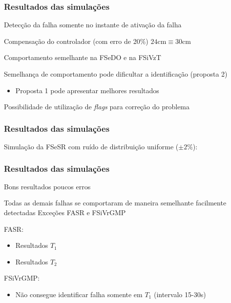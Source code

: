 \documentclass{beamer}
\begin{document}
\begin{frame}
    \frametitle{Resultados das simulações}

    Detecção da falha somente no instante de ativação da falha

    \vspace{0.25cm}

    Compensação do controlador (com erro de 20\%) \implica $24 \text{cm} \equiv
    30 \text{cm}$

    \vspace{0.25cm}

    Comportamento semelhante na FSeDO e na FSiVzT

    \vspace{0.25cm}

    Semelhança de comportamento pode dificultar a identificação (proposta 2)

\begin{itemize}
    \item Proposta 1 pode apresentar melhores resultados
\end{itemize}

    Possibilidade de utilização de {\it flags} para correção do problema

\end{frame}

\begin{frame}
    \frametitle{Resultados das simulações}

\footnotesize Simulação da FSeSR com ruído de distribuição uniforme ($\pm 2\%$):

\begin{figure}[htb]
\footnotesize
\centering
\scalebox{0.68}{}
\end{figure}
    
\end{frame}

\begin{frame}
    \frametitle{Resultados das simulações}

    Bons resultados \implica poucos erros

    \vspace{0.25cm}

    Todas as demais falhas se comportaram de maneira semelhante \implica
    facilmente detectadas \implica Exceções FASR e FSiVrGMP

    \vspace{0.25cm}

    FASR:

\begin{itemize}
    \item Resultados $T_1$ \alert{\Checkmark}
    \item Resultados $T_2$ \alert{\XSolidBrush}
\end{itemize}

    FSiVrGMP:

\begin{itemize}
    \item Não consegue identificar falha somente em $T_1$ (intervalo 15-30s)
\end{itemize}
\end{frame}
\end{document}
